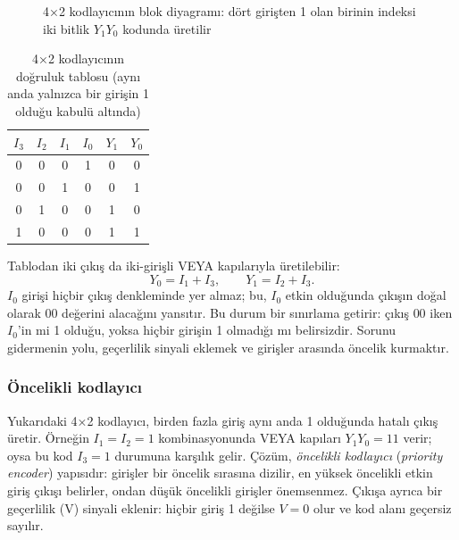 \begin{figure}[H]
\centering
{}
\caption{4×2 kodlayıcının blok diyagramı: dört girişten 1 olan birinin indeksi iki bitlik $Y_1 Y_0$ kodunda üretilir}
\label{fig:B.encoder-4to2}
\end{figure}

\begin{table}[H]
\centering
\caption{4×2 kodlayıcının doğruluk tablosu (aynı anda yalnızca bir girişin 1 olduğu kabulü altında)}
\label{tab:B.encoder-4to2}
\small
\begin{tabular}{cccc|cc}
\toprule
$I_3$ & $I_2$ & $I_1$ & $I_0$ & $Y_1$ & $Y_0$ \\
\midrule
0 & 0 & 0 & 1 & 0 & 0 \\
0 & 0 & 1 & 0 & 0 & 1 \\
0 & 1 & 0 & 0 & 1 & 0 \\
1 & 0 & 0 & 0 & 1 & 1 \\
\bottomrule
\end{tabular}
\end{table}

Tablodan iki çıkış da iki-girişli VEYA kapılarıyla üretilebilir:
\[ Y_0 = I_1 + I_3, \qquad Y_1 = I_2 + I_3. \]
$I_0$ girişi hiçbir çıkış denkleminde yer almaz; bu, $I_0$ etkin olduğunda çıkışın doğal olarak $00$ değerini alacağını yansıtır. Bu durum bir sınırlama getirir: çıkış $00$ iken $I_0$'in mi 1 olduğu, yoksa hiçbir girişin 1 olmadığı mı belirsizdir. Sorunu gidermenin yolu, geçerlilik sinyali eklemek ve girişler arasında öncelik kurmaktır.

\subsubsection{Öncelikli kodlayıcı}
Yukarıdaki 4×2 kodlayıcı, birden fazla giriş aynı anda 1 olduğunda hatalı çıkış üretir. Örneğin $I_1 = I_2 = 1$ kombinasyonunda VEYA kapıları $Y_1 Y_0 = 11$ verir; oysa bu kod $I_3 = 1$ durumuna karşılık gelir. Çözüm, \emph{öncelikli kodlayıcı} (\emph{priority encoder}) yapısıdır: girişler bir öncelik sırasına dizilir, en yüksek öncelikli etkin giriş çıkışı belirler, ondan düşük öncelikli girişler önemsenmez. Çıkışa ayrıca bir geçerlilik (V) sinyali eklenir: hiçbir giriş 1 değilse $V = 0$ olur ve kod alanı geçersiz sayılır.

